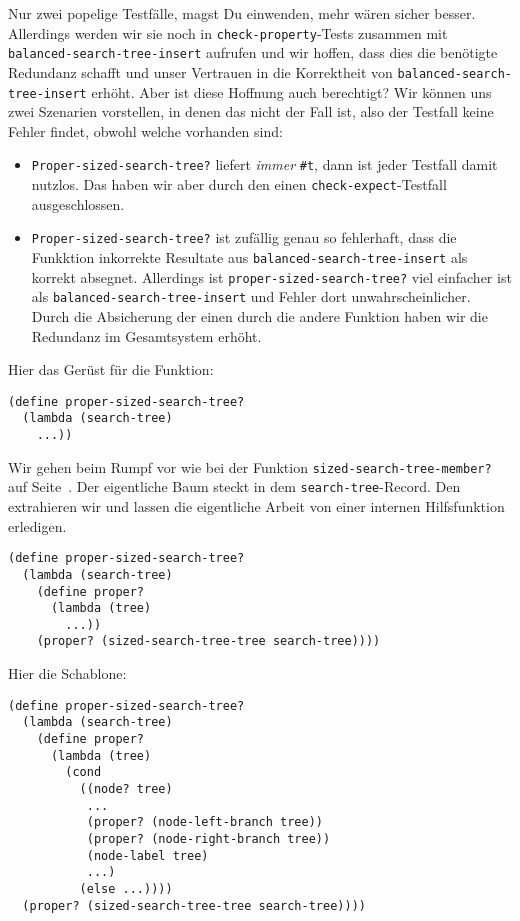 %
Nur zwei popelige Testfälle, magst Du einwenden, mehr wären sicher
besser.  Allerdings werden wir sie noch in
\lstinline{check-property}-Tests zusammen mit
\lstinline{balanced-search-tree-insert} aufrufen und wir hoffen, dass
dies die benötigte Redundanz schafft und unser Vertrauen in die
Korrektheit von
\lstinline{balanced-search-tree-insert} erhöht.  Aber ist diese
Hoffnung auch berechtigt?  Wir können uns zwei Szenarien vorstellen,
in denen das nicht der Fall ist, also der Testfall keine Fehler
findet, obwohl welche vorhanden sind:
%
\begin{itemize}
\item \lstinline{Proper-sized-search-tree?} liefert \emph{immer}
  \lstinline{#t}, dann ist jeder Testfall damit nutzlos.  Das haben
  wir aber durch den einen \lstinline{check-expect}-Testfall
  ausgeschlossen.
\item \lstinline{Proper-sized-search-tree?} ist zufällig genau so fehlerhaft,
  dass die Funkktion inkorrekte Resultate aus
  \lstinline{balanced-search-tree-insert} als korrekt absegnet.
  Allerdings ist
  \lstinline{proper-sized-search-tree?} viel einfacher ist als
  \lstinline{balanced-search-tree-insert} und Fehler dort
  unwahrscheinlicher.  Durch die Absicherung der einen durch die
  andere Funktion haben wir die Redundanz im
  Gesamtsystem erhöht.
\end{itemize}
%
Hier das Gerüst für die Funktion:
%
\begin{lstlisting}
(define proper-sized-search-tree?
  (lambda (search-tree)
    ...))
\end{lstlisting}
%
Wir gehen beim Rumpf vor wie bei der Funktion
\lstinline{sized-search-tree-member?} auf
Seite~\pageref{func:sized-search-tree-member}. Der eigentliche Baum
steckt in dem \lstinline{search-tree}-Record.  Den extrahieren
wir und lassen die eigentliche Arbeit von einer internen Hilfsfunktion erledigen.
%
\begin{lstlisting}
(define proper-sized-search-tree?
  (lambda (search-tree)
    (define proper?
      (lambda (tree)
        ...))
    (proper? (sized-search-tree-tree search-tree))))
\end{lstlisting}
%
Hier die Schablone:
%
\begin{lstlisting}
(define proper-sized-search-tree?
  (lambda (search-tree)
    (define proper?
      (lambda (tree)
        (cond
          ((node? tree)
           ...
           (proper? (node-left-branch tree))
           (proper? (node-right-branch tree))
           (node-label tree)
           ...)
          (else ...))))
  (proper? (sized-search-tree-tree search-tree))))
\end{lstlisting}
